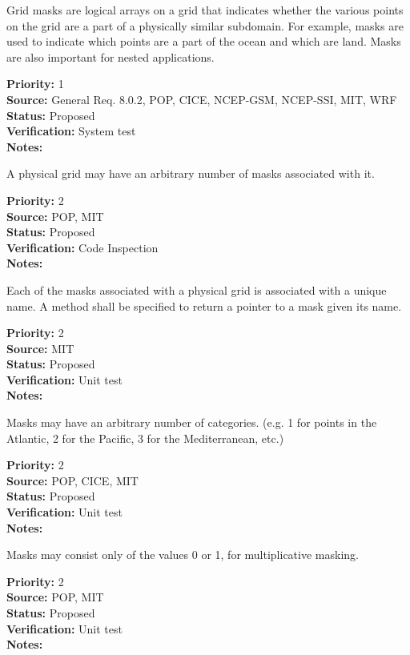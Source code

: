 Grid masks are logical arrays on a grid that indicates whether the various
points on the grid are a part of a physically similar subdomain. For example,
masks are used to indicate which points are a part of the ocean and which are
land.  Masks are also important for nested applications.

\begin{reqlist}
{\bf Priority:} 1 \\
{\bf Source:} General Req. 8.0.2, POP, CICE, NCEP-GSM, NCEP-SSI, MIT, WRF \\
{\bf Status:} Proposed \\
{\bf Verification:} System test\\
{\bf Notes:} 
\end{reqlist}

A physical grid may have an arbitrary number of masks associated with it.
\begin{reqlist}
{\bf Priority:} 2 \\
{\bf Source:} POP, MIT \\
{\bf Status:} Proposed \\
{\bf Verification:} Code Inspection\\
{\bf Notes:} 
\end{reqlist}

Each of the masks associated with a physical grid is associated with a
unique name.  A method shall be specified to return a pointer to a mask given
its name.
\begin{reqlist}
{\bf Priority:} 2 \\
{\bf Source:} MIT \\
{\bf Status:} Proposed \\
{\bf Verification:} Unit test\\
{\bf Notes:} 
\end{reqlist}

Masks may have an arbitrary number of categories. (e.g. 1 for points in the
Atlantic, 2 for the Pacific, 3 for the Mediterranean, etc.)
\begin{reqlist}
{\bf Priority:} 2 \\
{\bf Source:} POP, CICE, MIT \\
{\bf Status:} Proposed \\
{\bf Verification:} Unit test\\
{\bf Notes:} 
\end{reqlist}

Masks may consist only of the values 0 or 1, for multiplicative masking.
\begin{reqlist}
{\bf Priority:} 2 \\
{\bf Source:} POP, MIT \\
{\bf Status:} Proposed \\
{\bf Verification:} Unit test\\
{\bf Notes:} 
\end{reqlist}

